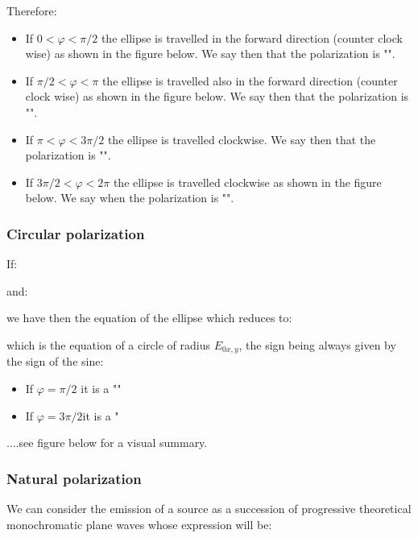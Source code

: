 	Therefore:
	\begin{itemize}
		\item If $0<\varphi <\pi/2$ the ellipse is travelled in the forward direction (counter clock wise) as shown in the figure below. We say then that the polarization is "".

		\item If $\pi/2<\varphi <\pi$ the ellipse is travelled also in the forward direction (counter clock wise) as shown in the figure below. We say then that the polarization is "".

		\item If $\pi<\varphi<3\pi/2$ the ellipse is travelled clockwise. We say then that the polarization is "".

		\item If $3\pi/2<\varphi<2\pi$ the ellipse is travelled clockwise as shown in the figure below. We say when the polarization is "".
	\end{itemize}
	
	\subsubsection{Circular polarization}
	If:
	
	and:
	
	we have then the equation of the ellipse which reduces to:
	
	which is the equation of a circle of radius $E_{0x,y}$, the sign being always given by the sign of the sine:
	\begin{itemize}
		\item If $\varphi=\pi/2$ it is a ""

		\item If $\varphi=3\pi/2$it is a "
	\end{itemize}
	....see figure below for a visual summary.
		
	\subsubsection{Natural polarization}
	We can consider the emission of a source as a succession of progressive theoretical monochromatic plane waves whose expression will be:
	
